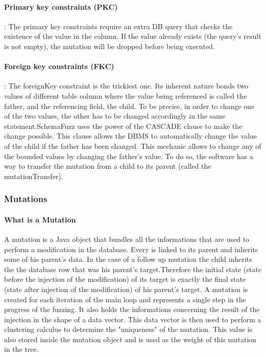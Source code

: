 \documentclass{article}
\begin{document}
\begin{empfile}
				\paragraph{Primary key constraints (PKC)} :
The primary key constraints require an extra DB query that checks the existence of the value in the column. If the value already exists (the query's result is not empty), the mutation will be dropped before being executed.
				\paragraph{Foreign key constraints (FKC)} :
The foreignKey constraint is the trickiest one. Its inherent nature bonds two values of different table column where the value being referenced is called the father, and the referencing field, the child. To be precise, in order to change one of the two values, the other has to be changed accordingly in the same statement.SchemaFuzz uses the power of the CASCADE clause to make the change possible. This clause allows the DBMS to automatically change the value of the child if the father has been changed.
This mechanic allows to change any of the bounded values by changing the father's value.
To do so, the software has a way to transfer the mutation from a child to its parent (called the mutationTransfer).

  				
			\subsubsection{Mutations}
				\paragraph{What is a Mutation}
A mutation is a Java object that bundles all the informations that are used to perform a modification in the database. Every is linked to its parent and inherits some of his parent's data. In the case of a follow up mutation the child inherits the the database row that was his parent's target.Therefore the initial state (state before the injection of the modification) of its target is exactly the final state (state after injection of the modification) of his parent's target. A mutation is created for each iteration of the main loop and represents a single step in the progress of the fuzzing.
It also holds the informations concerning the result of the injection in the shape of a data vector. This data vector is then used to perform a clustering calculus to determine the "uniqueness" of the mutation. This value is also stored inside the mutation object and is used as the weight of this mutation in the tree.


\end{empfile}
\end{document}
